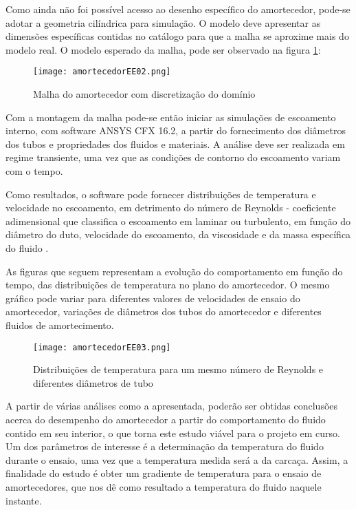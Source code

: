 	Como ainda não foi possível acesso ao desenho específico do amortecedor, pode-se adotar a geometria cilíndrica para simulação. O modelo deve apresentar as dimensões específicas contidas no catálogo para que a malha se aproxime mais do modelo real. O modelo esperado da malha, pode ser observado na figura \ref{amortecedorEE02}:

	\begin{figure}[!h]
		\centering
		\texttt{[image: amortecedorEE02.png]}
		\caption[Malha do amortecedor com discretização do domínio]{Malha do amortecedor com discretização do domínio \cite{Neto}}
		\label{amortecedorEE02}
	\end{figure}

	Com a montagem da malha pode-se então iniciar as simulações de escoamento interno, com software ANSYS CFX  16.2, a partir do fornecimento dos diâmetros dos tubos e propriedades dos fluidos e materiais. A análise deve ser realizada em regime transiente, uma vez que as condições de contorno do escoamento variam com o tempo.
	
	Como resultados, o software pode fornecer distribuições de temperatura e velocidade no escoamento, em detrimento do número de Reynolds - coeficiente adimensional que classifica o escoamento em laminar ou turbulento, em função do diâmetro do duto, velocidade do escoamento, da viscosidade e da massa específica do fluido \cite{Pariona}.
	
	As figuras que seguem representam a evolução do comportamento em função do tempo, das distribuições de temperatura no plano do amortecedor. O mesmo gráfico pode variar para diferentes valores de velocidades de ensaio do amortecedor, variações de diâmetros dos tubos do amortecedor e diferentes fluidos de amortecimento.

	\begin{figure}[!h]
		\centering
		\texttt{[image: amortecedorEE03.png]}
		\caption[Distribuições de temperatura para um mesmo número de Reynolds e diferentes diâmetros de tubo]{Distribuições de temperatura para um mesmo número de Reynolds e diferentes diâmetros de tubo \cite{Neto}} 
		\label{amortecedorEE03}
	\end{figure}

	A partir de várias análises como a apresentada, poderão ser obtidas conclusões acerca do desempenho do amortecedor a partir do comportamento do fluido contido em seu interior, o que torna este estudo viável para o projeto em curso. Um dos parâmetros de interesse é a determinação da temperatura do fluido durante o ensaio, uma vez que a temperatura medida será a da carcaça. Assim, a finalidade do estudo é obter um gradiente de temperatura para o ensaio de amortecedores, que nos dê como resultado a temperatura do fluido naquele instante.

